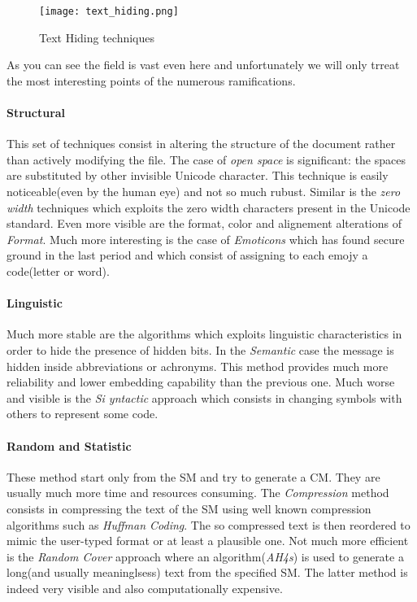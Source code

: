 \documentclass[../../main.tex]{subfiles}
\begin{document}
    \begin{figure}[h]
        \centering
        \caption{Text Hiding techniques}
        \texttt{[image: text\_hiding.png]}
    \end{figure}

    As you can see the field is vast even here and unfortunately we will only trreat the most interesting points of the numerous ramifications.

    \paragraph{Structural}
    This set of techniques consist in altering the structure of the document rather than actively modifying the file. The case of \emph{open space} is significant: the spaces are substituted by other
    invisible Unicode character. This technique is easily noticeable(even by the human eye) and not so much rubust. Similar is the \emph{zero width} techniques which exploits the zero width characters present in the Unicode standard.
    Even more visible are the format, color and alignement alterations of \emph{Format}. Much more interesting is the case of \emph{Emoticons} which has found secure ground in the last period and which consist of assigning to each emojy a code(letter or word).

    \paragraph{Linguistic}
    Much more stable are the algorithms which exploits linguistic characteristics in order to hide the presence of hidden bits. In the \emph{Semantic} case the message is hidden inside 
    abbreviations or achronyms. This method provides much more reliability and lower embedding capability than the previous one. Much worse and visible is the \emph{Si
yntactic} approach which consists in changing symbols with others to represent some code.

    \paragraph{Random and Statistic}
    These method start only from the SM and try to generate a CM. They are usually much more time and resources consuming. The \emph{Compression} method consists in compressing the 
    text of the SM using well known compression algorithms such as \emph{Huffman Coding}. The so compressed text is then reordered to mimic the user-typed format or at least a plausible one.
    Not much more efficient is the \emph{Random Cover} approach where an algorithm(\emph{AH4s}) is used to generate a long(and usually meaninglsess) text from the specified SM. The latter method is indeed very visible and also computationally expensive.
\end{document}
